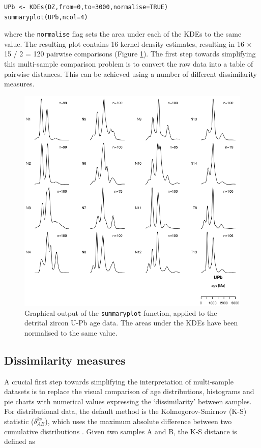\documentclass{article}
\begin{document}
\begin{verbatim}
UPb <- KDEs(DZ,from=0,to=3000,normalise=TRUE)
summaryplot(UPb,ncol=4)
\end{verbatim}

where the {\tt normalise} flag sets the area under each of the KDEs
to the same value. The resulting plot contains 16 kernel density
estimates, resulting in 16 $\times$ 15 / 2 = 120 pairwise comparisons
(Figure \ref{fig:KDEs}). The first step towards simplifying this
multi-sample comparison problem is to convert the raw data into a
table of pairwise distances. This can be achieved using a number of
different dissimilarity measures.

\begin{figure}
\centering
\includegraphics[width=.7\textwidth]{KDEs.png}
\caption{Graphical output of the {\tt summaryplot} function, applied
  to the detrital zircon U-Pb age data. The areas under the KDEs have
  been normalised to the same value.}
\label{fig:KDEs}
\end{figure}

\subsection{Dissimilarity measures}
\label{sec:dissimilarity}

A crucial first step towards simplifying the interpretation of
multi-sample datasets is to replace the visual comparison of age
distributions, histograms and pie charts with numerical values
expressing the `dissimilarity' between samples. For distributional
data, the default method is the Kolmogorov-Smirnov (K-S) statistic
($\delta^{ks}_{AB}$), which uses the maximum absolute difference
between two cumulative distributions \citep{feller1948}. Given two
samples A and B, the K-S distance is defined as
\end{document}
